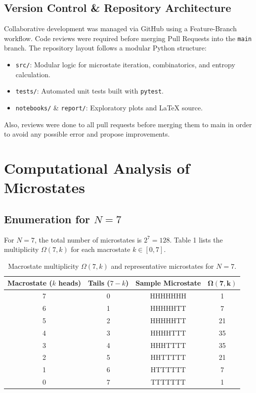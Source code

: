 \documentclass[10pt, a4paper]{article}
\begin{document}
\subsection{Version Control \& Repository Architecture}
Collaborative development was managed via GitHub using a Feature-Branch workflow. Code reviews were required before merging Pull Requests into the \texttt{main} branch. The repository layout follows a modular Python structure:
\begin{itemize}
    \item \texttt{src/}: Modular logic for microstate iteration, combinatorics, and entropy calculation.
    \item \texttt{tests/}: Automated unit tests built with \texttt{pytest}.
    \item \texttt{notebooks/} \& \texttt{report/}: Exploratory plots and \LaTeX{} source.
\end{itemize}
Also, reviews were done to all pull requests before merging them to main in order to avoid any possible error and propose improvements.

\section{Computational Analysis of Microstates}

\subsection{Enumeration for $N=7$}
For $N=7$, the total number of microstates is $2^7 = 128$. Table 1 lists the multiplicity $\Omega(7,k)$ for each macrostate $k \in [0,7]$.

\begin{table}[h]
\centering
\caption{Macrostate multiplicity $\Omega(7,k)$ and representative microstates for $N=7$.}
\vspace{0.5em}
\begin{tabular}{c c c c}
\toprule
\textbf{Macrostate ($k$ heads)} & \textbf{Tails ($7-k$)} & \textbf{Sample Microstate} & $\boldsymbol{\Omega(7,k)}$ \\
\midrule
7 & 0 & HHHHHHH & 1 \\
6 & 1 & HHHHHTT & 7 \\
5 & 2 & HHHHHTT & 21 \\
4 & 3 & HHHHTTT & 35 \\
3 & 4 & HHHTTTT & 35 \\
2 & 5 & HHTTTTT & 21 \\
1 & 6 & HTTTTTT & 7 \\
0 & 7 & TTTTTTT & 1 \\
\bottomrule
\end{tabular}
\end{table}
\end{document}
